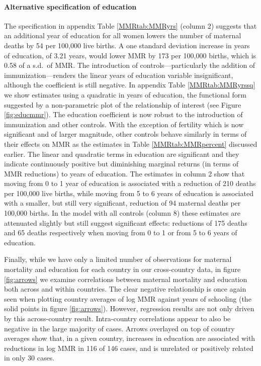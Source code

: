 \documentclass{article}[12pt,subeqn]
\begin{document}
\begin{spacing}{1.4}
\paragraph{Alternative specification of education}
The specification in appendix Table \ref{MMRtab:MMRyrs} (column 2) suggests that an 
additional year of education for all women lowers the number of maternal deaths 
by 54 per 100,000 live births. A one standard deviation increase in years of 
education, of 3.21 years, would lower MMR by 173 per 100,000 births, which is 0.58 
of a s.d.\ of MMR. The introduction of controls---particularly the addition of 
immunization---renders the linear years of education variable insignificant, 
although the coefficient is still negative. In appendix Table 
\ref{MMRtab:MMRyrssq} we show estimates using a quadratic in years of education,
the functional form suggested by a non-parametric plot of the relationship of 
interest (see Figure \ref{fig:educmmr}). The education coefficient is now robust 
to the introduction of immunization and other controls. With the exception of 
fertility which is now significant and of larger magnitude, other controls 
behave similarly in terms of their effects on MMR as the estimates in Table 
\ref{MMRtab:MMRpercent} discussed earlier. The linear and quadratic terms in education are 
significant and they indicate continuously positive but diminishing marginal 
returns (in terms of MMR reductions) to years of education. The estimates in 
column 2 show that moving from 0 to 1 year of education is associated with a 
reduction of 210 deaths per 100,000 live births, while moving from 5 to 6 years 
of education is associated with a smaller, but still very significant, reduction 
of 94 maternal deaths per 100,000 births. In the model with all controls (column 
8) these estimates are attenuated slightly but still suggest significant effects: 
reductions of 175 deaths and 65 deaths respectively when moving from 0 to 1 or 
from 5 to 6 years of education.

Finally, while we have only a limited number of observations for maternal
mortality and education for each country in our cross-country data, in figure
\ref{fig:arrows} we examine correlations between maternal mortality and 
education both across and within countries.  The clear negative relationship
is once again seen when plotting country averages of log MMR against years of
schooling (the solid points in figure \ref{fig:arrows}).  However, regression
results are not only driven by this across-country result.  Intra-country
correlations appear to also be negative in the large majority of cases. Arrows
overlayed on top of country averages show that, in a given country, increases
in education are associated with reductions in log MMR in 116 of 146 cases,
and is unrelated or positively related in only 30 cases.


\end{spacing}
\end{document}
